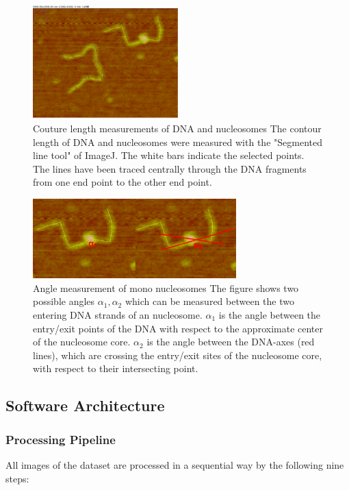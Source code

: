 \documentclass{article}
\begin{document}
\begin{figure}[h!]
\centering
\includegraphics[width = 0.5\textwidth]{coutureLength.png}
\caption{Couture length measurements of DNA and nucleosomes
The contour length of DNA and nucleosomes were measured with the "Segmented line tool" of ImageJ. The white bars indicate the selected points. The lines have been traced centrally through the DNA fragments from one end point to the other end point.}
\label{fig: couture length}
\end{figure}

\begin{figure}[h!]
\centering
\includegraphics[width=0.7\textwidth]{angleMeasurement.png}
\caption{Angle measurement of mono nucleosomes
The figure shows two possible angles $\alpha_1, \alpha_2$ which can be measured between the two entering DNA strands of an nucleosome. $\alpha_1$ is the angle between the entry/exit points of the DNA with respect to the approximate center of the nucleosome core. $\alpha_2$ is the angle between the DNA-axes (red lines), which are crossing the entry/exit sites of the nucleosome core, with respect to their intersecting point.}
\label{fig: angle measurement}
\end{figure}
\newpage
\subsection{Software Architecture}\label{sec:Software Architecture}


\subsubsection{Processing Pipeline}
All images of the dataset are processed in a sequential way by the following nine steps:
\end{document}
